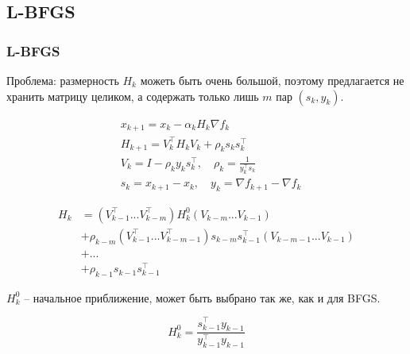 \subsection{L-BFGS}

\begin{frame}
  \frametitle{L-BFGS}
  Проблема: размерность $H_k$ можеть быть очень большой, поэтому предлагается не хранить матрицу целиком, а содержать только лишь $m$ пар $(s_k, y_k)$.

  \begin{align*}
    & x_{k+1} = x_k - \alpha_k H_k \nabla f_k \\
    & H_{k+1} = V_k^\intercal H_k V_k + \rho_k s_k s_k^\intercal \\
    & V_k = I - \rho_k y_k s_k^\intercal, \quad \rho_k = \frac{1}{y_k^\intercal s_k} \\
    & s_k = x_{k+1} - x_k, \quad y_k = \nabla f_{k+1} - \nabla f_k
  \end{align*}
\end{frame}

\begin{frame}

  \begin{align*}
    H_k & = \left( V_{k-1}^\intercal ... V_{k-m}^\intercal \right)H_k^0 \left(V_{k-m} ... V_{k-1} \right) \\
        & + \rho_{k-m}  \left( V_{k-1}^\intercal ... V_{k-m-1}^\intercal \right) s_{k-m} s_{k-1}^\intercal \left(V_{k-m-1} ... V_{k-1} \right) \\
        & + ... \\
        & + \rho_{k-1} s_{k-1} s_{k-1}^\intercal
  \end{align*}

  $H_k^0$ -- начальное приближение, может быть выбрано так же, как и для BFGS.

  \begin{equation*}
    H_k^0 = \frac{s_{k-1}^\intercal y_{k-1}}{y_{k-1}^\intercal y_{k-1}}
  \end{equation*}
  
\end{frame}

